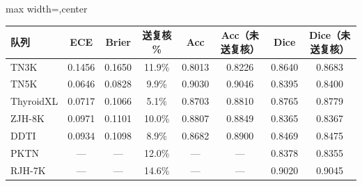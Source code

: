 \begin{responsetable}
\caption{}
\begin{adjustbox}{max width=\textwidth,center}
\scriptsize
\begin{tabular}{lccccccc}
\toprule
队列 & ECE & Brier & 送复核 \% & Acc & Acc（未送复核） & Dice & Dice（未送复核） \\
\midrule
TN3K & 0.1456 & 0.1650 & 11.9\% & 0.8013 & 0.8226 & 0.8640 & 0.8683 \\
TN5K & 0.0646 & 0.0828 & 9.9\% & 0.9030 & 0.9046 & 0.8395 & 0.8400 \\
ThyroidXL & 0.0717 & 0.1066 & 5.1\% & 0.8703 & 0.8810 & 0.8765 & 0.8779 \\
ZJH-8K & 0.0971 & 0.1101 & 10.0\% & 0.8807 & 0.8849 & 0.8365 & 0.8367 \\
DDTI & 0.0934 & 0.1098 & 8.9\% & 0.8682 & 0.8900 & 0.8469 & 0.8475 \\
PKTN & --- & --- & 12.0\% & --- & --- & 0.8378 & 0.8355 \\
RJH-7K & --- & --- & 14.6\% & --- & --- & 0.9020 & 0.9045 \\
\bottomrule
\end{tabular}
\end{adjustbox}
\end{responsetable}

